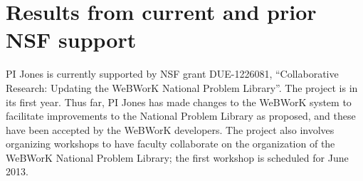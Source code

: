 \documentclass[12pt]{amsart}
\numberwithin{equation}{section}
\begin{document}
\section{Results from current and prior NSF support}
PI Jones is currently supported by NSF grant DUE-1226081,
``Collaborative Research: Updating the WeBWorK National Problem
Library''.  The project is in its first year.  Thus far, PI Jones has
made changes to the WeBWorK system to facilitate improvements to the
National Problem Library as proposed, and these have been accepted by
the WeBWorK developers.  The project also involves organizing
workshops to have faculty collaborate on the organization of the
WeBWorK National Problem Library; the first workshop is scheduled for
June 2013.


\end{document}
